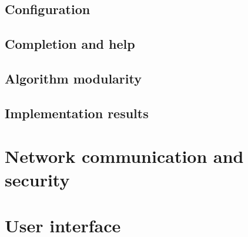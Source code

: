 \section{Configuration}
\label{sec:cmd_config}


\section{Completion and help}
\label{sec:cmd_help}


\section{Algorithm modularity}
\label{sec:algs_modularity}


\section{Implementation results}
\label{sec:lattice_performance_measuring}


\chapter{Network communication and security}
\label{ch:network_com_sec}


\chapter{User interface}
\label{ch:user_interf}
